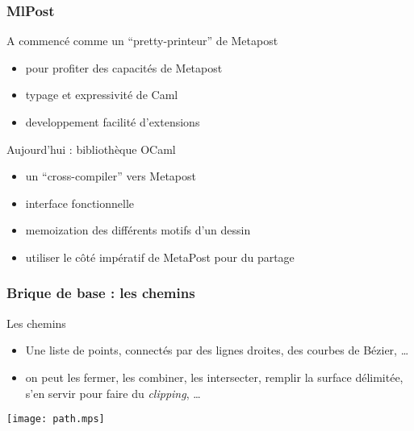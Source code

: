 \documentclass[nodefaultblocks]{beamer}
\begin{document}
\begin{frame}\frametitle{MlPost}
  \begin{block}{A commencé comme un ``pretty-printeur'' de Metapost}
    \begin{itemize}
      \item pour profiter des capacités de Metapost 
      \item typage et expressivité de Caml
      \item developpement facilité d'extensions
    \end{itemize}
  \end{block}

  \begin{block}{Aujourd'hui : bibliothèque OCaml}
    \begin{itemize}
      \item un ``cross-compiler'' vers Metapost
      \item interface fonctionnelle
      \item memoization des différents motifs d'un dessin
      \item utiliser le côté impératif de MetaPost pour du partage
    \end{itemize}
  \end{block}

\end{frame}

\begin{frame}\frametitle{Brique de base : les chemins}
  \begin{block}{Les chemins}
    \begin{itemize}
      \item Une liste de points, connectés par des lignes droites, des courbes
        de Bézier, \dots
      \item on peut les fermer, les combiner, les intersecter, remplir la
        surface délimitée, s'en servir pour faire du {\em clipping}, \dots
    \end{itemize}
  \end{block}
  \begin{center}
  \texttt{[image: path.mps]}
  \end{center}
\end{frame}
\end{document}
